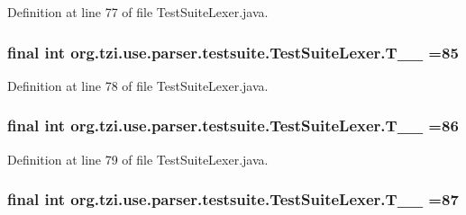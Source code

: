Definition at line 77 of file Test\-Suite\-Lexer.\-java.

\hypertarget{classorg_1_1tzi_1_1use_1_1parser_1_1testsuite_1_1_test_suite_lexer_a81a65c614b3d679078e5a82c3af2994f}{
\subsubsection[{T\-\_\-\-\_\-85}]{\setlength{\rightskip}{0pt plus 5cm}final int org.\-tzi.\-use.\-parser.\-testsuite.\-Test\-Suite\-Lexer.\-T\-\_\-\-\_ =85\hspace{0.3cm}{\ttfamily [static]}}}\label{classorg_1_1tzi_1_1use_1_1parser_1_1testsuite_1_1_test_suite_lexer_a81a65c614b3d679078e5a82c3af2994f}


Definition at line 78 of file Test\-Suite\-Lexer.\-java.

\hypertarget{classorg_1_1tzi_1_1use_1_1parser_1_1testsuite_1_1_test_suite_lexer_afddf404c1f0c0a5b60eb26809efaf45f}{
\subsubsection[{T\-\_\-\-\_\-86}]{\setlength{\rightskip}{0pt plus 5cm}final int org.\-tzi.\-use.\-parser.\-testsuite.\-Test\-Suite\-Lexer.\-T\-\_\-\-\_ =86\hspace{0.3cm}{\ttfamily [static]}}}\label{classorg_1_1tzi_1_1use_1_1parser_1_1testsuite_1_1_test_suite_lexer_afddf404c1f0c0a5b60eb26809efaf45f}


Definition at line 79 of file Test\-Suite\-Lexer.\-java.

\hypertarget{classorg_1_1tzi_1_1use_1_1parser_1_1testsuite_1_1_test_suite_lexer_afab612c3bafe2d87a6ade8d3082c9551}{
\subsubsection[{T\-\_\-\-\_\-87}]{\setlength{\rightskip}{0pt plus 5cm}final int org.\-tzi.\-use.\-parser.\-testsuite.\-Test\-Suite\-Lexer.\-T\-\_\-\-\_ =87\hspace{0.3cm}{\ttfamily [static]}}}\label{classorg_1_1tzi_1_1use_1_1parser_1_1testsuite_1_1_test_suite_lexer_afab612c3bafe2d87a6ade8d3082c9551}



